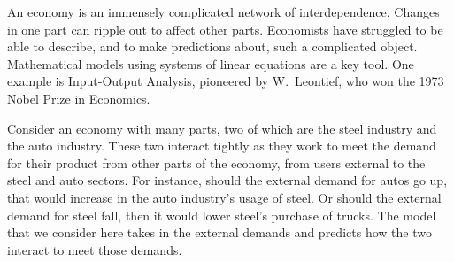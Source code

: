 An economy is an immensely complicated network of interdependence.
Changes in one part can ripple out to affect other parts.
Economists have struggled to be able to describe, and to make
predictions about, such a complicated object.
Mathematical models using systems of linear equations
are a key tool.
One example is Input-Output Analysis, pioneered by 
W.~Leontief, 
who won the 1973 Nobel Prize in Economics.

Consider an economy with many parts, two of which are the steel industry and
the auto industry.
These two interact tightly
as they work to meet the demand for their product
from other parts of the economy, from users external to the steel and
auto sectors.
For instance, should the external demand for autos go up, that would 
increase in the auto industry's usage of steel.
Or should the external demand for steel fall, then it would lower
steel's purchase of trucks.
The model that
we consider here takes in the external demands
and predicts how the two interact to meet those demands.

